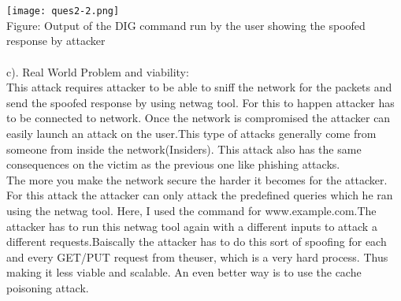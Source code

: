 \documentclass{article}
\begin{document}
\\
\\
\texttt{[image: ques2-2.png]}
\\Figure: Output of the DIG command run by the user showing the spoofed response by attacker
\\
\\
c). Real World Problem and viability: 
\\
This attack requires attacker to be able to sniff the network for the packets and send the spoofed response by using netwag tool.
For this to happen attacker has to be connected to network. Once the network is compromised the attacker can easily launch an attack on the user.This type of attacks generally come from someone from inside the network(Insiders). This attack also has the same consequences on the victim as the previous one like phishing attacks.
\\
The more you make the network secure the harder it becomes for the attacker. For this attack the attacker can only attack the predefined queries which he ran using the netwag tool. Here, I used the command for www.example.com.The attacker has to run this netwag tool again with a different inputs to attack a different requests.Baiscally the attacker has to do this sort of spoofing for each and every GET/PUT request from theuser, which is a very hard process. Thus making it less viable and scalable. An even better way is to use the cache poisoning attack.\\ \\
\end{document}
